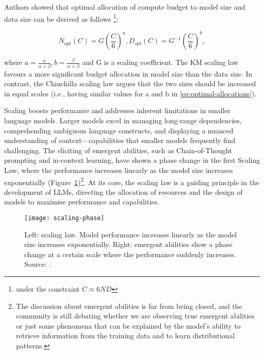 \begin{enumerate}
{		      Authors showed that optimal allocation of compute budget to model size and data size can be derived as follows \footnote{under the constraint \(C \approx 6ND\)}:

		      \begin{center}
			      \begin{equation}
				      N_{opt}(C) = G(\frac{C}{6})^a, D_{opt}(C) = G^{-1}(\frac{C}{6})^b, \label{eq:optimal-allocations}
			      \end{equation}
		      \end{center}

		      \noindent where $a=\frac{\alpha}{\alpha+\beta}, b=\frac{\beta}{\alpha+\beta}$ and G is a scaling coefficient.
		      The KM scaling law favours a more significant budget allocation in model size than the data size. In contrast, the Chinchilla scaling law argues that the two sizes should be increased in equal scales \cite{hoffmann2022training} (i.e., having similar values for a and b in \eqref{eq:optimal-allocations}).
	      }
\end{enumerate}

Scaling boosts performance and addresses inherent limitations in smaller language models.
Larger models excel in managing long-range dependencies, comprehending ambiguous language constructs, and displaying a nuanced understanding of context---capabilities that smaller models frequently find challenging.
The eliciting of emergent abilities, such as Chain-of-Thought prompting and in-context learning, have shown a phase change in the first Scaling Law, where the performance increases linearly as the model size increases exponentially (Figure~\ref{fig:scaling-phase})\footnote{The discussion about emergent abilities is far from being closed, and the community is still debating whether we are observing true emergent abilities or just some phenomena that can be explained by the model's ability to retrieve information from the training data and to learn distributional patterns.}.
At its core, the scaling law is a guiding principle in the development of LLMs, directing the allocation of resources and the design of models to maximise performance and capabilities.

\begin{figure}[h!]
	\centering
	\texttt{[image: scaling-phase]}
	\caption{Left: scaling law. Model performance increases linearly as the model size increases exponentially. Right: emergent abilities show a phase change at a certain scale where the performance suddenly increases. Source: \textcite{yaofu2023emergent}.}
	\label{fig:scaling-phase}
\end{figure}

